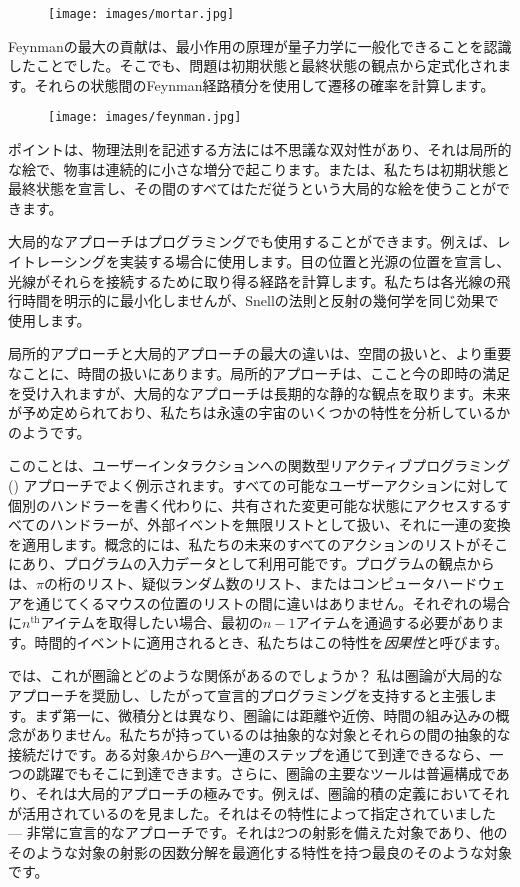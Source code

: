 \begin{figure}[H]
  \centering
  \texttt{[image: images/mortar.jpg]}
\end{figure}

\noindent
Feynmanの最大の貢献は、最小作用の原理が量子力学に一般化できることを認識したことでした。そこでも、問題は初期状態と最終状態の観点から定式化されます。それらの状態間のFeynman経路積分を使用して遷移の確率を計算します。

\begin{figure}[H]
  \centering
  \texttt{[image: images/feynman.jpg]}
\end{figure}

\noindent
ポイントは、物理法則を記述する方法には不思議な双対性があり、それは局所的な絵で、物事は連続的に小さな増分で起こります。または、私たちは初期状態と最終状態を宣言し、その間のすべてはただ従うという大局的な絵を使うことができます。

大局的なアプローチはプログラミングでも使用することができます。例えば、レイトレーシングを実装する場合に使用します。目の位置と光源の位置を宣言し、光線がそれらを接続するために取り得る経路を計算します。私たちは各光線の飛行時間を明示的に最小化しませんが、Snellの法則と反射の幾何学を同じ効果で使用します。

局所的アプローチと大局的アプローチの最大の違いは、空間の扱いと、より重要なことに、時間の扱いにあります。局所的アプローチは、ここと今の即時の満足を受け入れますが、大局的なアプローチは長期的な静的な観点を取ります。未来が予め定められており、私たちは永遠の宇宙のいくつかの特性を分析しているかのようです。

このことは、ユーザーインタラクションへの関数型リアクティブプログラミング () アプローチでよく例示されます。すべての可能なユーザーアクションに対して個別のハンドラーを書く代わりに、共有された変更可能な状態にアクセスするすべてのハンドラーが、外部イベントを無限リストとして扱い、それに一連の変換を適用します。概念的には、私たちの未来のすべてのアクションのリストがそこにあり、プログラムの入力データとして利用可能です。プログラムの観点からは、$\pi$の桁のリスト、疑似ランダム数のリスト、またはコンピュータハードウェアを通じてくるマウスの位置のリストの間に違いはありません。それぞれの場合に$n^\text{th}$アイテムを取得したい場合、最初の$n-1$アイテムを通過する必要があります。時間的イベントに適用されるとき、私たちはこの特性を\emph{因果性}と呼びます。

では、これが圏論とどのような関係があるのでしょうか？ 私は圏論が大局的なアプローチを奨励し、したがって宣言的プログラミングを支持すると主張します。まず第一に、微積分とは異なり、圏論には距離や近傍、時間の組み込みの概念がありません。私たちが持っているのは抽象的な対象とそれらの間の抽象的な接続だけです。ある対象$A$から$B$へ一連のステップを通じて到達できるなら、一つの跳躍でもそこに到達できます。さらに、圏論の主要なツールは普遍構成であり、それは大局的アプローチの極みです。例えば、圏論的積の定義においてそれが活用されているのを見ました。それはその特性によって指定されていました --- 非常に宣言的なアプローチです。それは2つの射影を備えた対象であり、他のそのような対象の射影の因数分解を最適化する特性を持つ最良のそのような対象です。

